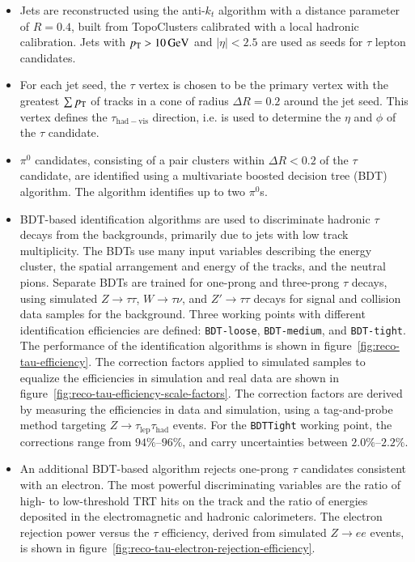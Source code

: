 \begin{itemize}
	\item Jets are reconstructed using the anti-$k_t$ algorithm with a distance parameter of $R=0.4$, built from TopoClusters calibrated with a local hadronic calibration. Jets with $p_{\text{T}}>\SI{10}{\giga\electronvolt}$ and $|\eta|<2.5$ are used as seeds for $\tau$ lepton candidates.

	\item For each jet seed, the $\tau$ vertex is chosen to be the primary vertex with the greatest $\sum p_{\text{T}}$ of tracks in a cone of radius $\Delta R=0.2$ around the jet seed. This vertex defines the $\tau_{\mathrm{had-vis}}$ direction, i.e. is used to determine the $\eta$ and $\phi$ of the $\tau$ candidate. 

	\item $\pi^0$ candidates, consisting of a pair clusters within $\Delta R<0.2$ of the $\tau$ candidate, are identified using a multivariate boosted decision tree (BDT) algorithm. The algorithm identifies up to two $\pi^0$s.

	\item BDT-based identification algorithms are used to discriminate hadronic $\tau$ decays from the backgrounds, primarily due to jets with low track multiplicity. The BDTs use many input variables describing the energy cluster, the spatial arrangement and energy of the tracks, and the neutral pions. Separate BDTs are trained for one-prong and three-prong $\tau$ decays, using simulated $Z\rightarrow\tau\tau$, $W\rightarrow \tau\nu$, and $Z'\rightarrow\tau\tau$ decays for signal and collision data samples for the background. Three working points with different identification efficiencies are defined: \texttt{BDT-loose}, \texttt{BDT-medium}, and \texttt{BDT-tight}. The performance of the identification algorithms is shown in figure~\ref{fig:reco-tau-efficiency}. The correction factors applied to simulated samples to equalize the efficiencies in simulation and real data are shown in figure~\ref{fig:reco-tau-efficiency-scale-factors}. The correction factors are derived by measuring the efficiencies in data and simulation, using a tag-and-probe method targeting $Z\rightarrow\tau_{\mathrm{lep}}\tau_{\mathrm{had}}$ events. For the \texttt{BDTTight} working point, the corrections range from $94\%$--$96\%$, and carry uncertainties between $2.0\%$--$2.2\%$. 

	\item An additional BDT-based algorithm rejects one-prong $\tau$ candidates consistent with an electron. The most powerful discriminating variables are the ratio of high- to low-threshold TRT hits on the track and the ratio of energies deposited in the electromagnetic and hadronic calorimeters. The electron rejection power versus the $\tau$ efficiency, derived from simulated $Z\rightarrow ee$ events, is shown in figure~\ref{fig:reco-tau-electron-rejection-efficiency}.  
\end{itemize}

